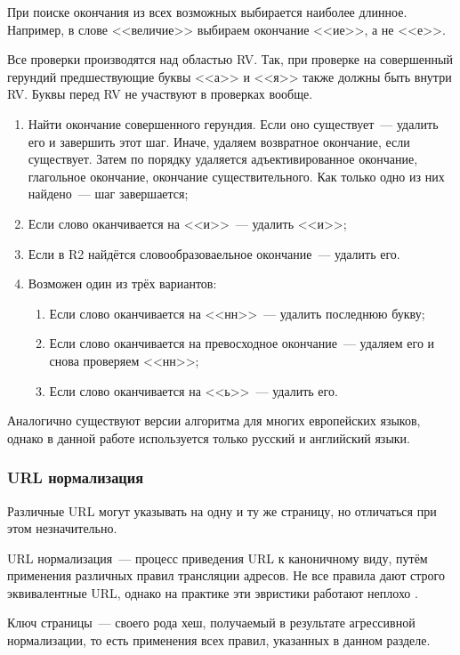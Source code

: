 При поиске окончания из всех возможных выбирается наиболее длинное. Например, в слове <<величие>> выбираем окончание <<ие>>, а не <<е>>.

Все проверки производятся над областью RV. Так, при проверке на совершенный герундий предшествующие буквы <<а>> и <<я>> также должны быть внутри RV. Буквы перед RV не участвуют в проверках вообще.

\begin{enumerate}
  \item Найти окончание совершенного герундия. Если оно существует~--- удалить его и завершить этот шаг. Иначе, удаляем возвратное окончание, если существует. Затем по порядку удаляется адъективированное окончание, глагольное окончание, окончание существительного. Как только одно из них найдено~--- шаг завершается;
  \item Если слово оканчивается на <<и>>~--- удалить <<и>>;
  \item Если в R2 найдётся словообразоваельное окончание~--- удалить его.
  \item Возможен один из трёх вариантов:
    \begin{enumerate}
      \item Если слово оканчивается на <<нн>>~--- удалить последнюю букву;
      \item Если слово оканчивается на превосходное окончание~--- удаляем его и снова проверяем <<нн>>;
      \item Если слово оканчивается на <<ь>>~--- удалить его.
    \end{enumerate}
\end{enumerate}

Аналогично существуют версии алгоритма для многих европейских языков, однако в данной работе используется только русский и английский языки.


\subsubsection{URL нормализация} \label{sssec:url-normalization}
Различные URL могут указывать на одну и ту же страницу, но отличаться при этом незначительно.

URL нормализация~--- процесс приведения URL к каноничному виду, путём применения различных правил трансляции адресов. Не все правила дают строго эквивалентные URL, однако на практике эти эвристики работают неплохо \cite{pant04}.

Ключ страницы~--- своего рода хеш, получаемый в результате агрессивной нормализации, то есть применения всех правил, указанных в данном разделе.


